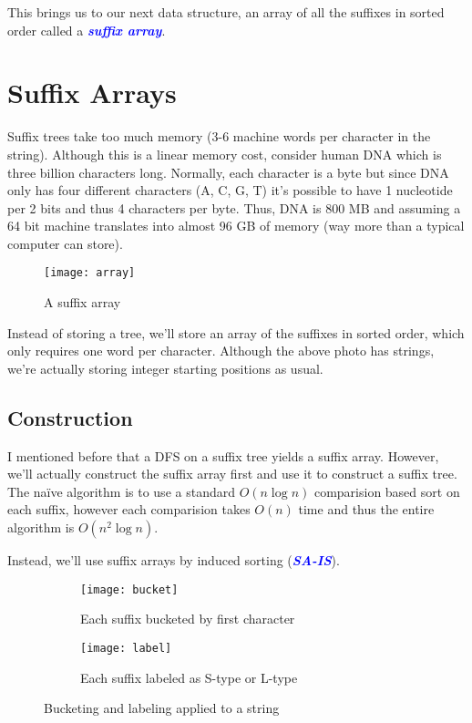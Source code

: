 \documentclass[11pt, oneside]{article}
\newcommand{\emphasis}[1]{\textcolor{blue}{\textbf{\textit{#1}}}}
\begin{document}
This brings us to our next data structure, an array of all the suffixes in sorted order called a \emphasis{suffix array}.

\section{Suffix Arrays}

Suffix trees take too much memory (3-6 machine words per character in the string).
Although this is a linear memory cost, consider human DNA which is three billion characters long.
Normally, each character is a byte but since DNA only has four different characters (A, C, G, T)
it's possible to have 1 nucleotide per 2 bits and thus 4 characters per byte.
Thus, DNA is 800 MB and assuming a 64 bit machine translates into almost 96 GB of memory
(way more than a typical computer can store).

\begin{figure}[h!]
\centering
\texttt{[image: array]}
\caption{A suffix array}
\end{figure}

Instead of storing a tree, we'll store an array of the suffixes in sorted order,
which only requires one word per character. Although the above photo has strings,
we're actually storing integer starting positions as usual.

\subsection{Construction}

I mentioned before that a DFS on a suffix tree yields a suffix array.
However, we'll actually construct the suffix array first and use it to construct a
suffix tree. The naïve algorithm is to use a standard \( O(n \log n) \) comparision based
sort on each suffix, however each comparision takes \( O(n) \) time and thus the entire algorithm
is \( O(n^2 \log n) \).

Instead, we'll use suffix arrays by induced sorting (\emphasis{SA-IS}).

\begin{figure}[h!]
    \centering
    \begin{subfigure}[h]{\textwidth}
      \centering
      \texttt{[image: bucket]}
      \caption{Each suffix bucketed by first character}
    \end{subfigure}
    \newline
    \begin{subfigure}[h]{\textwidth}
      \centering
      \texttt{[image: label]}
      \caption{Each suffix labeled as S-type or L-type}
    \end{subfigure}
    \caption{Bucketing and labeling applied to a string}
\end{figure}
\end{document}
